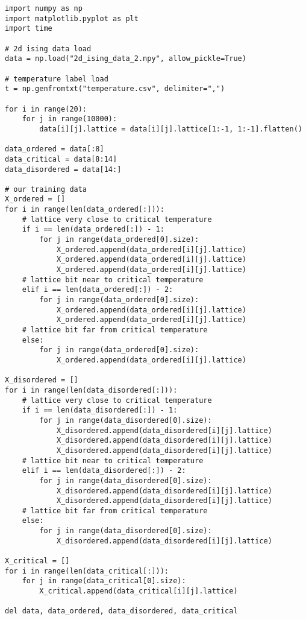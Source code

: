 \begin{verbatim}
import numpy as np
import matplotlib.pyplot as plt
import time

# 2d ising data load
data = np.load("2d_ising_data_2.npy", allow_pickle=True)

# temperature label load
t = np.genfromtxt("temperature.csv", delimiter=",")

for i in range(20):
    for j in range(10000):
        data[i][j].lattice = data[i][j].lattice[1:-1, 1:-1].flatten()

data_ordered = data[:8]
data_critical = data[8:14]
data_disordered = data[14:]

# our training data
X_ordered = []
for i in range(len(data_ordered[:])):
    # lattice very close to critical temperature
    if i == len(data_ordered[:]) - 1:
        for j in range(data_ordered[0].size):
            X_ordered.append(data_ordered[i][j].lattice)
            X_ordered.append(data_ordered[i][j].lattice)
            X_ordered.append(data_ordered[i][j].lattice)
    # lattice bit near to critical temperature
    elif i == len(data_ordered[:]) - 2:
        for j in range(data_ordered[0].size):
            X_ordered.append(data_ordered[i][j].lattice)
            X_ordered.append(data_ordered[i][j].lattice)
    # lattice bit far from critical temperature
    else:
        for j in range(data_ordered[0].size):
            X_ordered.append(data_ordered[i][j].lattice)

X_disordered = []
for i in range(len(data_disordered[:])):
    # lattice very close to critical temperature
    if i == len(data_disordered[:]) - 1:
        for j in range(data_disordered[0].size):
            X_disordered.append(data_disordered[i][j].lattice)
            X_disordered.append(data_disordered[i][j].lattice)
            X_disordered.append(data_disordered[i][j].lattice)
    # lattice bit near to critical temperature
    elif i == len(data_disordered[:]) - 2:
        for j in range(data_disordered[0].size):
            X_disordered.append(data_disordered[i][j].lattice)
            X_disordered.append(data_disordered[i][j].lattice)
    # lattice bit far from critical temperature
    else:
        for j in range(data_disordered[0].size):
            X_disordered.append(data_disordered[i][j].lattice)

X_critical = []
for i in range(len(data_critical[:])):
    for j in range(data_critical[0].size):
        X_critical.append(data_critical[i][j].lattice)

del data, data_ordered, data_disordered, data_critical


\end{verbatim}
